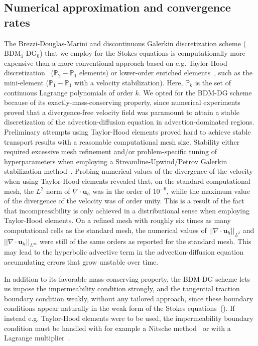 \documentclass[fleqn]{wlscirep}
\newcommand{\normltwo}[1]{{ \vert\vert#1\vert\vert}_{L^2}}
\newcommand{\normlinf}[1]{{\vert\vert#1\vert\vert}_{L^{\infty}}}
\newcommand{\uu}{\mathbf{u}}
\begin{document}
\subsection*{Numerical approximation and convergence rates}
The Brezzi-Douglas-Marini and discontinuous Galerkin discretization scheme
($\mathrm{BDM}_1$-$\mathrm{DG}_0$) that we employ for the Stokes equations
is computationally more expensive than a more conventional approach based on
e.g. Taylor-Hood discretization~\cite{Stenberg1990ErrorProblem}
($\mathbb{P}_2-\mathbb{P}_1$ elements) or lower-order enriched elements~\cite{Brezzi2011MixedMethods},
such as the mini-element ($\mathbb{P}_1-\mathbb{P}_1$ with a velocity stabilization).
Here, $\mathbb{P}_k$ is the set of continuous Lagrange polynomials of order $k$.
We opted for the BDM-DG scheme because of its exactly-mass-conserving property,
since numerical experiments proved that a divergence-free velocity field was
paramount to attain a stable discretization of the advection-diffusion equation
in advection-dominated regions. Preliminary attempts using Taylor-Hood elements
proved hard to achieve stable transport results with a reasonable computational mesh size.
Stability either required excessive mesh refinement and/or problem-specific tuning of
hyperparameters when employing a Streamline-Upwind/Petrov Galerkin stabilization
method~\cite{Franca1992StabilizedModel}. Probing numerical values of the divergence of
the velocity when using Taylor-Hood elements revealed that, on the standard computational
mesh, the $L^2$ norm of $\nabla\cdot\uu_h$ was in the order of $10^{-6}$, while the
maximum value of the divergence of the velocity was of order unity. This is a result
of the fact that incompressibility is only achieved in a distributional sense when
employing Taylor-Hood elements. On a refined mesh with roughly six times as many
computational cells as the standard mesh, the numerical values of
$\normltwo{\nabla\cdot\uu_h}$ and $\normlinf{\nabla\cdot\uu_h}$ were still
of the same orders as reported for the standard mesh. This may lead to the
hyperbolic advective term in the advection-diffusion equation accumulating errors
that grow unstable over time. 

In addition to its favorable mass-conserving property, the BDM-DG scheme
lets us impose the impermeability condition strongly, and the tangential
traction boundary condition weakly, without any tailored approach,
since these boundary conditions appear naturally in the weak form of the
Stokes equations~(). If instead e.g. Taylor-Hood
elements were to be used, the impermeability boundary condition must
be handled with for example a Nitsche method~\cite{Nitsche1971UberSind}
or with a Lagrange multiplier~\cite{Babuska1973TheMultipliers, Bertoluzza2017BoundaryHemodynamics}. 
\end{document}
